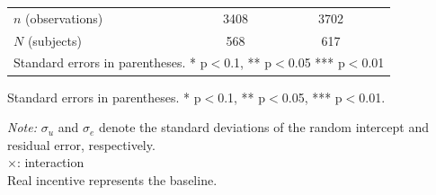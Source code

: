 \documentclass[12pt]{article}
\begin{document}
{\begin{table}[H]
{\begin{tabular}{l*{2}{cc}}
\hline
\(n\) (observations)       &        3408         &            &        3702         &            \\
\(N\) (subjects)       &        568         &            &        617         &            \\
\hline\hline
\multicolumn{5}{l}{\footnotesize Standard errors in parentheses. * p$<$0.1, ** p$<$0.05 *** p$<$0.01}\\
\end{tabular}
}





\begin{tablenotes}
            \footnotesize
            \item Standard errors in parentheses. * p$<$0.1, ** p$<$0.05, *** p$<$0.01.
            \item \textit{Note:} $\sigma_u$ and $\sigma_e$ denote the standard deviations of the random intercept and residual error, respectively.\\
            $\times$: interaction\\
            Real incentive represents the baseline.\\
        \end{tablenotes}
\end{table}
\clearpage




}
\end{document}
